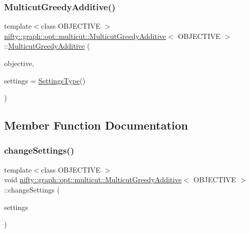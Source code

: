 \subsubsection{\texorpdfstring{Multicut\+Greedy\+Additive()}{MulticutGreedyAdditive()}}
{\footnotesize\ttfamily template$<$class O\+B\+J\+E\+C\+T\+I\+VE $>$ \\
\hyperlink{classnifty_1_1graph_1_1opt_1_1multicut_1_1MulticutGreedyAdditive}{nifty\+::graph\+::opt\+::multicut\+::\+Multicut\+Greedy\+Additive}$<$ O\+B\+J\+E\+C\+T\+I\+VE $>$\+::\hyperlink{classnifty_1_1graph_1_1opt_1_1multicut_1_1MulticutGreedyAdditive}{Multicut\+Greedy\+Additive} (\begin{DoxyParamCaption}\item[{const \hyperlink{classnifty_1_1graph_1_1opt_1_1multicut_1_1MulticutGreedyAdditive_a20bb4420504be890fcb487d70fa51dc0}{Objective\+Type} \&}]{objective,  }\item[{const \hyperlink{classnifty_1_1graph_1_1opt_1_1multicut_1_1MulticutGreedyAdditive_a074ee39f5884cff7359f5c0997929e2f}{Settings\+Type} \&}]{settings = {\ttfamily \hyperlink{classnifty_1_1graph_1_1opt_1_1multicut_1_1MulticutGreedyAdditive_a074ee39f5884cff7359f5c0997929e2f}{Settings\+Type}()} }\end{DoxyParamCaption})}



\subsection{Member Function Documentation}
\mbox{\label{classnifty_1_1graph_1_1opt_1_1multicut_1_1MulticutGreedyAdditive_a21de41d91712f8078343e974f4e119c7}} 
\subsubsection{\texorpdfstring{change\+Settings()}{changeSettings()}}
{\footnotesize\ttfamily template$<$class O\+B\+J\+E\+C\+T\+I\+VE $>$ \\
void \hyperlink{classnifty_1_1graph_1_1opt_1_1multicut_1_1MulticutGreedyAdditive}{nifty\+::graph\+::opt\+::multicut\+::\+Multicut\+Greedy\+Additive}$<$ O\+B\+J\+E\+C\+T\+I\+VE $>$\+::change\+Settings (\begin{DoxyParamCaption}\item[{const \hyperlink{classnifty_1_1graph_1_1opt_1_1multicut_1_1MulticutGreedyAdditive_a074ee39f5884cff7359f5c0997929e2f}{Settings\+Type} \&}]{settings }\end{DoxyParamCaption})\hspace{0.3cm}{\ttfamily [inline]}}


